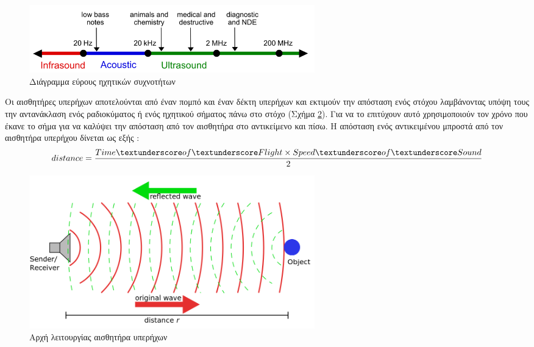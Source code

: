 \begin{figure}[H]
    \centering
    \includegraphics[width=0.6\textwidth]{images/Ultrasound_range_diagram.png}
    \caption{Διάγραμμα εύρους ηχητικών συχνοτήτων}
    \label{fig:ultrasound-range}
\end{figure}
\hspace{1cm}

Οι αισθητήρες υπερήχων αποτελούνται από έναν πομπό και έναν δέκτη υπερήχων και εκτιμούν την απόσταση ενός στόχου λαμβάνοντας υπόψη τους την αντανάκλαση ενός ραδιοκύματος ή ενός ηχητικού σήματος πάνω στο στόχο (Σχήμα \ref{fig:sonar-principle}). Για να το επιτύχουν αυτό χρησιμοποιούν τον χρόνο που έκανε το σήμα για να καλύψει την απόσταση από τον αισθητήρα στο αντικείμενο και πίσω. Η απόσταση ενός αντικειμένου μπροστά από τον αισθητήρα υπερήχου δίνεται ως εξής \cite{Theworki10:online}: \[distance = \frac{Time\textunderscore of\textunderscore Flight \times Speed\textunderscore of\textunderscore Sound}{2}\]

\begin{figure}[H]
    \centering
    \includegraphics[width=0.6\textwidth]{images/Sonar_Principle.png}
    \caption{Αρχή λειτουργίας αισθητήρα υπερήχων}
    \label{fig:sonar-principle}
\end{figure}
\hspace{1cm}


